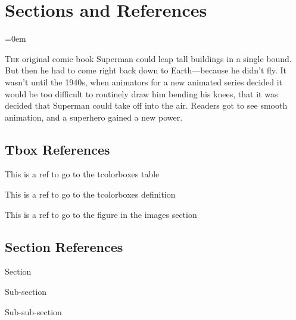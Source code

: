 




\section{Sections and References}
\label{sec:sections_and_references}
\parindent=0em

\lettrine[lines=3, findent=3pt, nindent=0pt]{T}{he} original comic book Superman
could leap tall buildings in a single bound. But then he had to come right back
down to Earth—because he didn't fly. It wasn't until the 1940s, when animators
for a new animated series decided it would be too difficult to routinely draw
him bending his knees, that it was decided that Superman could take off into the
air. Readers got to see smooth animation, and a superhero gained a new power.
\vspace{0.5cm}

\subsection{Tbox References}
\label{ssec:tbox_references}

This is a ref to go to the tcolorboxes table 

This is a ref to go to the tcolorboxes definition 

This is a ref to go to the figure in the images section 

\subsectionend

\vspace{0.5cm}

\subsection{Section References}
\label{ssec:section_references}

Section 

Sub-section 

Sub-sub-section 


\subsectionend

